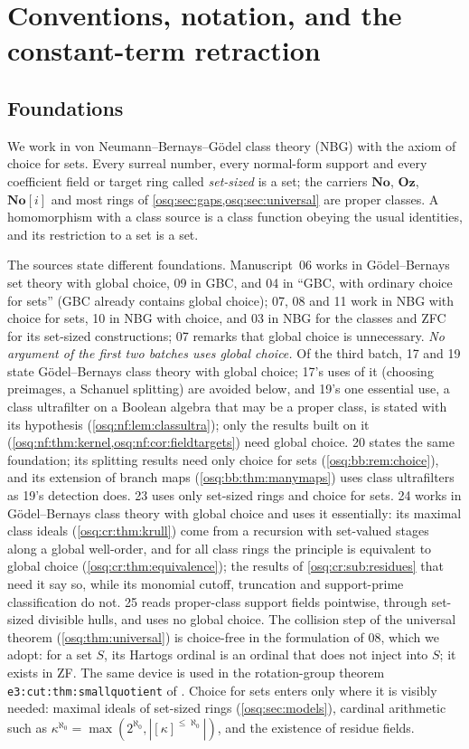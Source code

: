 \documentclass[11pt,letterpaper]{article}
\numberwithin{equation}{section}
\theoremstyle{definition}
\theoremstyle{remark}
\theoremstyle{plain}
\newcommand{\No}{\mathbf{No}}
\newcommand{\Oz}{\mathbf{Oz}}
\newcommand{\SC}{\No[i]}
\begin{document}
\section{Conventions, notation, and the constant-term retraction}
\label{osq:sec:conv}

\subsection{Foundations}\label{osq:sub:foundations}
We work in von Neumann--Bernays--G\"odel class theory (NBG) with the axiom of
choice for sets. Every surreal number, every normal-form support and every
coefficient field or target ring called \emph{set-sized} is a set; the carriers
$\No$, $\Oz$, $\SC$ and most rings of \cref{osq:sec:gaps,osq:sec:universal} are
proper classes. A homomorphism with a class source is a class function obeying
the usual identities, and its restriction to a set is a set.

The sources state different foundations. Manuscript~06 works in G\"odel--Bernays
set theory with global choice, 09 in GBC, and 04 in ``GBC, with ordinary choice
for sets'' (GBC already contains global choice); 07, 08 and 11 work in NBG with
choice for sets, 10 in NBG with choice, and 03 in NBG for the classes and ZFC for
its set-sized constructions; 07 remarks that global choice is unnecessary.
\emph{No argument of the first two batches uses global choice.} Of the third batch, 17 and 19 state
G\"odel--Bernays class theory with global choice; 17's uses of it (choosing preimages, a Schanuel
splitting) are avoided below, and 19's one essential use, a class ultrafilter on a Boolean algebra
that may be a proper class, is stated with its hypothesis (\cref{osq:nf:lem:classultra}); only the
results built on it (\cref{osq:nf:thm:kernel,osq:nf:cor:fieldtargets}) need global choice. 20 states the same foundation;
its splitting results need only choice for sets (\cref{osq:bb:rem:choice}), and its extension of branch maps
(\cref{osq:bb:thm:manymaps}) uses class ultrafilters as 19's detection does. 23 uses only set-sized rings and choice for sets. 24 works in
G\"odel--Bernays class theory with global choice and uses it essentially: its maximal class ideals (\cref{osq:cr:thm:krull}) come from a recursion with
set-valued stages along a global well-order, and for all class rings the principle is equivalent to global choice (\cref{osq:cr:thm:equivalence});
the results of \cref{osq:cr:sub:residues} that need it say so, while its monomial cutoff, truncation and support-prime classification do not. 25 reads
proper-class support fields pointwise, through set-sized divisible hulls, and uses no global choice. The collision step of the
universal theorem (\cref{osq:thm:universal}) is choice-free in the formulation of
08, which we adopt: for a set $S$, its Hartogs ordinal is an ordinal that does not
inject into $S$; it exists in ZF. The same device is used in the rotation-group
theorem \nolinkurl{e3:cut:thm:smallquotient} of \cite{RepoE3}. Choice for sets enters
only where it is visibly needed: maximal ideals of set-sized rings
(\cref{osq:sec:models}), cardinal arithmetic such as
$\kappa^{\aleph_0}=\max(2^{\aleph_0},|[\kappa]^{\le\aleph_0}|)$, and the
existence of residue fields.
\end{document}
